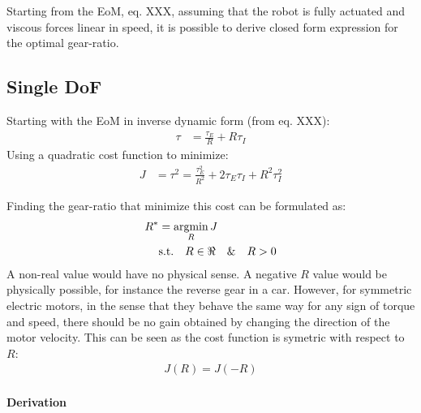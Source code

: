 Starting from the EoM, eq. XXX, assuming that the robot is fully actuated and viscous forces linear in speed, it is possible to derive closed form expression for the optimal gear-ratio.


\subsection{Single DoF}
\label{sec:optgearproof1}

Starting with the EoM in inverse dynamic form (from eq. XXX):
%
\begin{align}
\tau  &=  \frac{\tau_E}{R} + R \tau_I
\end{align}
%
Using a quadratic cost function to minimize:
%
\begin{align}
J &=  \tau^2 = \frac{\tau_E^2}{R^2} + 2 \tau_E \tau_I + R^2 \tau_I^2
\end{align}
%

Finding the gear-ratio that minimize this cost can be formulated as:
%
\begin{align}
R^* &=  \operatornamewithlimits{argmin}\limits_{R} J \\
   &   \text{s.t.} \quad R \in \Re  \quad \& \quad R > 0
\end{align}
%
A non-real value would have no physical sense. A negative $R$ value would be physically possible, for instance the reverse gear in a car. However, for symmetric electric motors, in the sense that they behave the same way for any sign of torque and speed, there should be no gain obtained by changing the direction of the motor velocity. This can be seen as the cost function is symetric with respect to $R$:
%
\begin{align}
J(R) = J( -R )
\end{align}
%

\paragraph{Derivation}

